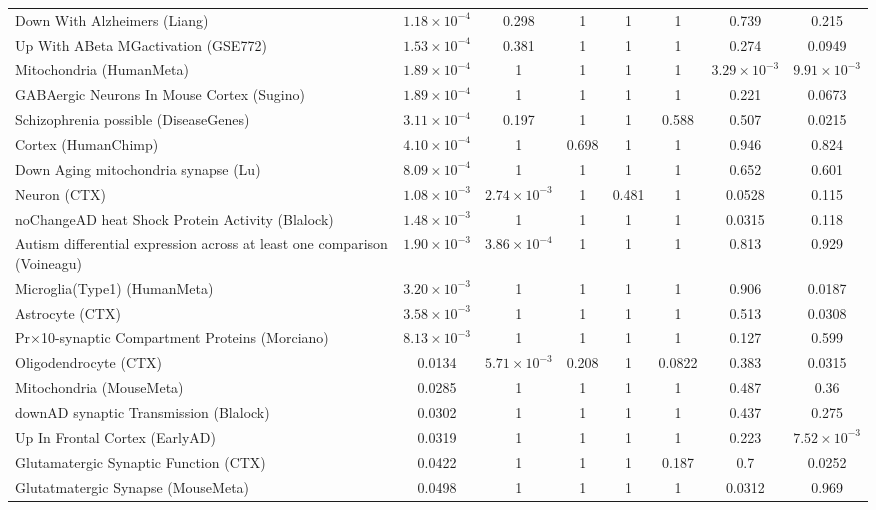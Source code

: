 \begin{landscape}
\begin{longtable}{p{2.5cm}ccccccc}
    Down With Alzheimers (Liang) & $1.18\times 10^{-4}$ &0.298 & 1     & 1     & 1     & 0.739 & 0.215 \\
    Up With ABeta MGactivation (GSE772) & $1.53\times 10^{-4}$ &  0.381 & 1     & 1     & 1     & 0.274 & 0.0949 \\
    Mitochondria (HumanMeta) & $1.89\times 10^{-4}$ & 1     & 1     & 1     & 1     &  $3.29\times 10^{-3}$ & $9.91\times 10^{-3}$ \\
    GABAergic Neurons In Mouse Cortex (Sugino) & $1.89\times 10^{-4}$ & 1     & 1     & 1     & 1     &   0.221 & 0.0673 \\
    Schizophrenia possible (DiseaseGenes) & $3.11\times 10^{-4}$ & 0.197 & 1     & 1     & 0.588 &   0.507 & 0.0215 \\
    Cortex (HumanChimp) & $4.10\times 10^{-4}$ & 1     & 0.698 & 1     & 1     &  0.946 & 0.824 \\
    Down Aging mitochondria synapse (Lu) & $8.09\times 10^{-4}$  & 1     & 1     & 1     & 1     &   0.652 & 0.601 \\
    Neuron (CTX) & $1.08\times 10^{-3}$ & $2.74\times 10^{-3}$ & 1     & 0.481 & 1     &  0.0528 & 0.115 \\
    noChangeAD heat Shock Protein Activity (Blalock) & $1.48\times 10^{-3}$  & 1     & 1     & 1     & 1     &  0.0315 & 0.118 \\
    Autism differential expression across at least one comparison (Voineagu) & $1.90\times 10^{-3}$& $3.86\times 10^{-4}$ & 1     & 1     & 1     &  0.813 & 0.929 \\
    Microglia(Type1) (HumanMeta) & $3.20\times 10^{-3}$ & 1     & 1     & 1     & 1     &  0.906 & 0.0187 \\
    Astrocyte (CTX) & $3.58\times 10^{-3}$ &1     & 1     & 1     & 1     &   0.513 & 0.0308 \\
    Pr×10-synaptic Compartment Proteins (Morciano) & $8.13\times 10^{-3}$ & 1     & 1     & 1     & 1     & 0.127 & 0.599 \\
    Oligodendrocyte (CTX) & 0.0134  & $5.71\times 10^{-3}$ & 0.208 & 1     & 0.0822 & 0.383 & 0.0315 \\
    Mitochondria (MouseMeta) & 0.0285  & 1     & 1     & 1     & 1     &  0.487 & 0.36 \\
    downAD synaptic Transmission (Blalock) & 0.0302 & 1     & 1     & 1     & 1     & 0.437 & 0.275 \\
    Up In Frontal Cortex (EarlyAD) & 0.0319    & 1     & 1     & 1     & 1     & 0.223 & $7.52\times 10^{-3}$ \\
    Glutamatergic Synaptic Function (CTX) & 0.0422& 1     & 1     & 1     & 0.187       & 0.7   & 0.0252 \\
    Glutatmatergic Synapse (MouseMeta) & 0.0498   & 1     & 1     & 1     & 1      & 0.0312 & 0.969 \\
    \bottomrule
    \end{longtable}%
\end{landscape}